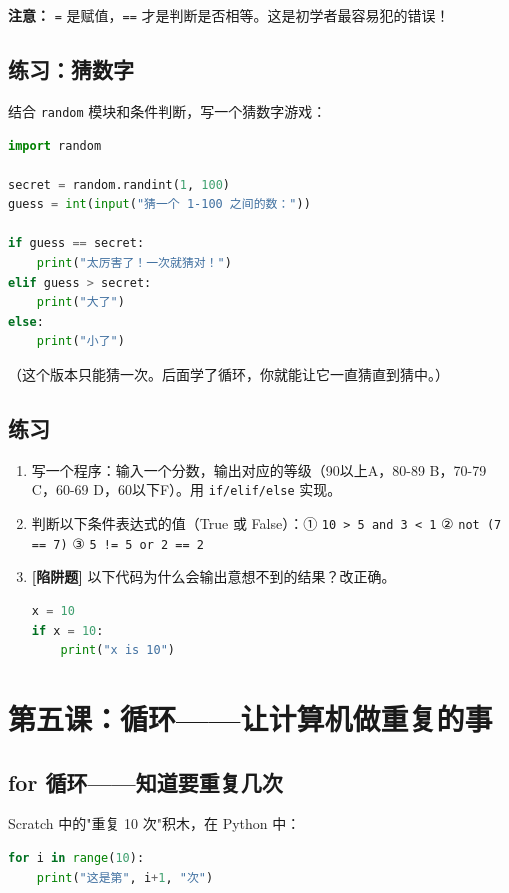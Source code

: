 \documentclass[a4paper,12pt]{ctexart}
\begin{document}
\textbf{注意：} \texttt{=} 是赋值，\texttt{==} 才是判断是否相等。这是初学者最容易犯的错误！

\subsection*{练习：猜数字}

结合 \texttt{random} 模块和条件判断，写一个猜数字游戏：

\begin{lstlisting}[language=Python]
import random

secret = random.randint(1, 100)
guess = int(input("猜一个 1-100 之间的数："))

if guess == secret:
    print("太厉害了！一次就猜对！")
elif guess > secret:
    print("大了")
else:
    print("小了")
\end{lstlisting}

（这个版本只能猜一次。后面学了循环，你就能让它一直猜直到猜中。）

\subsection*{练习}

\begin{enumerate}
  \item 写一个程序：输入一个分数，输出对应的等级（90以上A，80-89 B，70-79 C，60-69 D，60以下F）。用 \texttt{if/elif/else} 实现。
  \item 判断以下条件表达式的值（True 或 False）：① \texttt{10 > 5 and 3 < 1} ② \texttt{not (7 == 7)} ③ \texttt{5 != 5 or 2 == 2}
  \item \textbf{[陷阱题]} 以下代码为什么会输出意想不到的结果？改正确。
\begin{lstlisting}[language=Python]
x = 10
if x = 10:
    print("x is 10")
\end{lstlisting}
\end{enumerate}

\section*{第五课：循环——让计算机做重复的事}

\subsection*{for 循环——知道要重复几次}

Scratch 中的"重复 10 次"积木，在 Python 中：

\begin{lstlisting}[language=Python]
for i in range(10):
    print("这是第", i+1, "次")
\end{lstlisting}
\end{document}
